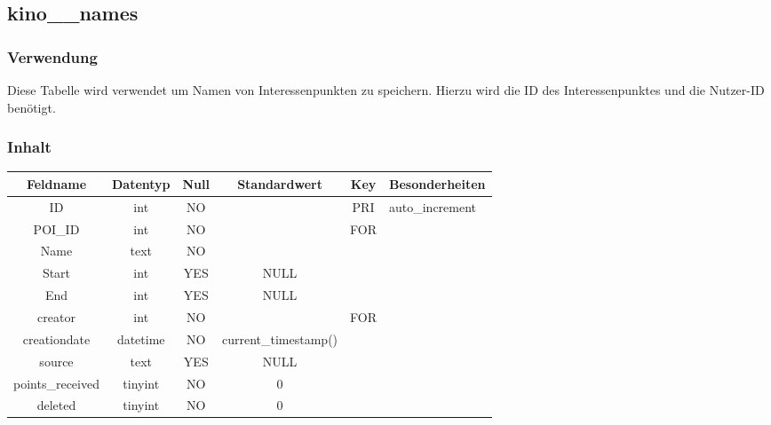 \subsection{kino\_\_names}
\subsubsection{Verwendung} Diese Tabelle wird verwendet um Namen von Interessenpunkten zu speichern. Hierzu wird die ID des Interessenpunktes und die Nutzer-ID benötigt.
\subsubsection{Inhalt}
\begin{table}[H]
	\begin{tabular}{|c|c|c|c|c|p{3.5cm}|}
		\hline
		\textbf{Feldname} & \textbf{Datentyp} & \textbf{Null} & \textbf{Standardwert} & \textbf{Key}   & \textbf{Besonderheiten} \\ \hline
		ID & int & NO &  & PRI & auto\_increment \\ \hline
		POI\_ID & int & NO &  & FOR & \\ \hline
		Name & text & NO &  &  & \\ \hline
		Start & int & YES & NULL &  & \\ \hline
		End & int & YES & NULL &  & \\ \hline
		creator & int & NO &  & FOR & \\ \hline
		creationdate & datetime & NO & current\_timestamp() &  & \\ \hline
		source & text & YES & NULL &  & \\ \hline
		points\_received & tinyint & NO & 0 &  & \\ \hline
		deleted & tinyint & NO & 0 &  & \\ \hline
	\end{tabular}
\end{table}
